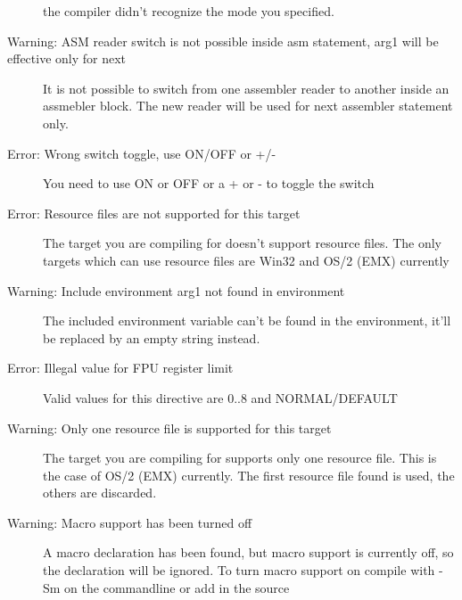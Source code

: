 \begin{description}
 the compiler didn't recognize the mode you specified.
\item [Warning: ASM reader switch is not possible inside asm statement, arg1 will be effective only for next]
 It is not possible to switch from one assembler reader to another
 inside an assmebler block. The new reader will be used for next
 assembler statement only.
\item [Error: Wrong switch toggle, use ON/OFF or +/-]
 You need to use ON or OFF or a + or - to toggle the switch
\item [Error: Resource files are not supported for this target]
 The target you are compiling for doesn't support resource files. The
 only targets which can use resource files are Win32 and OS/2 (EMX) currently
\item [Warning: Include environment arg1 not found in environment]
 The included environment variable can't be found in the environment, it'll
 be replaced by an empty string instead.
\item [Error: Illegal value for FPU register limit]
 Valid values for this directive are 0..8 and NORMAL/DEFAULT
\item [Warning: Only one resource file is supported for this target]
 The target you are compiling for supports only one resource file. This is the
 case of OS/2 (EMX) currently. The first resource file found is used, the
 others are discarded.
\item [Warning: Macro support has been turned off]
 A macro declaration has been found, but macro support is currently off,
 so the declaration will be ignored. To turn macro support on compile with
 -Sm on the commandline or add  in the source
 \end{description}
